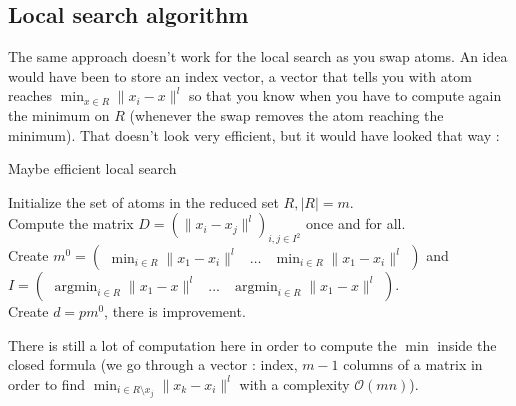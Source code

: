 \documentclass{amsart}
\newcommand{\argmin}{\mathop{\arg\min}}
\begin{document}
\subsection{Local search algorithm}
The same approach doesn't work for the local search as you swap atoms. An idea would have been to store an index vector, a vector that tells you with atom reaches $\min_{x\in R}\lVert x_i-x\rVert^l$ so that you know when you have to compute again the minimum on $R$ (whenever the swap removes the atom reaching the minimum). That doesn't look very efficient, but it would have looked that way : 
\begin{algorithm}
\caption{Maybe efficient local search}
Initialize the set of atoms in the reduced set $R, \lvert R\rvert=m$.\\
Compute the matrix $D = \left(\| x_i - x_j \|^l \right)_{i,j \in I^2}$ once and for all.\\
Create $m^0 = \begin{pmatrix}\min_{i\in R}\lVert x_1-x_i\rVert^l & \hdots & \min_{i\in R}\lVert x_1-x_i\rVert^l \end{pmatrix}$ and $I=\begin{pmatrix}\argmin_{i\in R}\lVert x_1-x\rVert^l & \hdots & \argmin_{i\in R}\lVert x_1-x\rVert^l \end{pmatrix}$.\\
Create $d=pm^0$, there is improvement. \\
\end{algorithm}
There is still a lot of computation here in order to compute the $\min$ inside the closed formula (we go through a vector : index, $m-1$ columns of a matrix in order to find $\min_{i\in R\setminus x_j}\lVert x_k-x_i\rVert^l$ with a complexity $\mathcal{O}\left(mn\right)$). 
\end{document}
